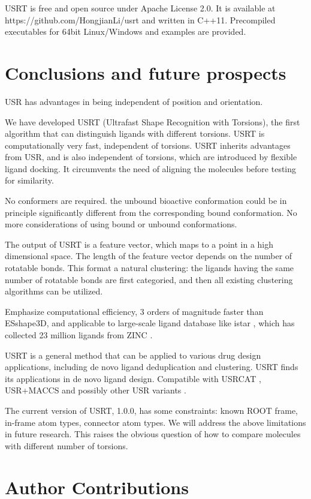 \documentclass[twocolumn]{svjour3}          %
\begin{document}
USRT is free and open source under Apache License 2.0. It is available at https://github.com/HongjianLi/usrt and written in C++11. Precompiled executables for 64bit Linux/Windows and examples are provided.

\section{Conclusions and future prospects}

USR has advantages in being independent of position and orientation.

We have developed USRT (Ultrafast Shape Recognition with Torsions), the first algorithm that can distinguish ligands with different torsions. USRT is computationally very fast, independent of torsions. USRT inherits advantages from USR, and is also independent of torsions, which are introduced by flexible ligand docking. It circumvents the need of aligning the molecules before testing for similarity.

No conformers are required. the unbound bioactive conformation could be in principle significantly different from the corresponding bound conformation. No more considerations of using bound or unbound conformations.

The output of USRT is a feature vector, which maps to a point in a high dimensional space. The length of the feature vector depends on the number of rotatable bonds. This format a natural clustering: the ligands having the same number of rotatable bonds are first categoried, and then all existing clustering algorithms can be utilized.

Emphasize computational efficiency, 3 orders of magnitude faster than ESshape3D, and applicable to large-scale ligand database like istar \cite{1362}, which has collected 23 million ligands from ZINC \cite{532,1178}.

USRT is a general method that can be applied to various drug design applications, including de novo ligand deduplication and clustering. USRT finds its applications in de novo ligand design. Compatible with USRCAT \cite{1331}, USR+MACCS \cite{1333} and possibly other USR variants \cite{1334}.

The current version of USRT, 1.0.0, has some constraints: known ROOT frame, in-frame atom types, connector atom types. We will address the above limitations in future research. This raises the obvious question of how to compare molecules with different number of torsions.

\section{Author Contributions}
\end{document}
